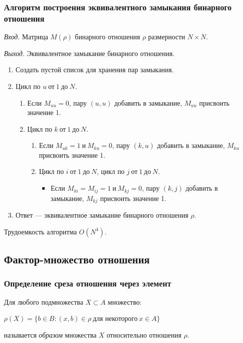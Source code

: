 \documentclass[bachelor, och, labwork]{shiza}
\begin{document}
\subsubsection{Алгоритм построения эквивалентного замыкания бинарного отношения}

\textit{Вход.} Матрица $M(\rho)$ бинарного отношения $\rho$ размерности
$N \times N$.

\textit{Выход.} Эквивалентное замыкание бинарного отношения.

\begin{enumerate}
    \item Создать пустой список для хранения пар замыкания.

    \item Цикл по $u ~\text{от}~ 1 ~\text{до}~ N$.
        \begin{enumerate}
            \item Если $M_{uu} = 0$, пару $(u, u)$ добавить в замыкание, $M_{uu}$ присвоить значение  1.
            \item Цикл по $k ~\text{от}~ 1 ~\text{до}~ N$.
                \begin{enumerate}
                    \item Если $M_{uk} = 1 ~\text{и}~ M_{ku} = 0 $, пару $(k, u)$ добавить в замыкание, $M_{ku}$ присвоить значение 1.
                    \item Цикл по $i ~\text{от}~ 1 ~\text{до}~ N$, цикл по $j ~\text{от}~ 1 ~\text{до}~ N$.
                        \begin{itemize}[label=1.]
                            \item Если $M_{ki} = M_{ij} = 1 ~\text{и}~ M_{kj} = 0$, пару $(k, j)$ добавить в замыкание, $M_{kj}$ присвоить значение 1.
                        \end{itemize} 
                \end{enumerate} 
        \end{enumerate}

    \item Ответ --- эквивалентное замыкание бинарного отношения $\rho$.
\end{enumerate}
Трудоемкость алгоритма $O(N^4)$.

\subsection{Фактор-множество отношения}

\subsubsection{Определение среза отношения через элемент}
Для любого подмножества $X \subset A$ множество:
\begin{center} $\rho(X)=\{b \in B:(x,b)\in \rho ~\text{для некоторого}~ x\in A\}$ \end{center}
называется \textit{образом} множества $X$ относительно отношения $\rho$.
\end{document}
